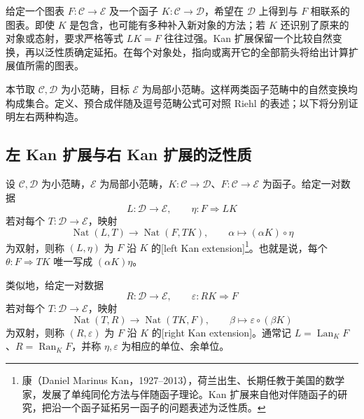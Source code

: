 

给定一个图表 \(F:\mathcal C\rightarrow\mathcal E\) 及一个函子 \(K:\mathcal C\rightarrow\mathcal D\)，希望在 \(\mathcal D\) 上得到与 \(F\) 相联系的图表。即使 \(K\) 是包含，也可能有多种补入新对象的方法；若 \(K\) 还识别了原来的对象或态射，要求严格等式 \(LK=F\) 往往过强。Kan 扩展保留一个比较自然变换，再以泛性质确定延拓。在每个对象处，指向或离开它的全部箭头将给出计算扩展值所需的图表。

\ProseParagraphBreak
本节取 \(\mathcal C,\mathcal D\) 为小范畴，目标 \(\mathcal E\) 为局部小范畴。这样两类函子范畴中的自然变换均构成集合。定义、预合成伴随及逗号范畴公式可对照 Riehl 的表述\cite[Definition 6.1.1; Proposition 6.1.5; Theorem 6.2.1]{Riehl2016CategoryTheory}；以下将分别证明左右两种构造。

\subsection{左 Kan 扩展与右 Kan 扩展的泛性质}
\label{b4:subsec:0305:01}

\begin{definition}[左右 Kan 扩展]\label{b4:def:kan-extension}
	设 \(\mathcal C,\mathcal D\) 为小范畴，\(\mathcal E\) 为局部小范畴，\(K:\mathcal C\rightarrow\mathcal D\)、\(F:\mathcal C\rightarrow\mathcal E\) 为函子。给定一对数据
	\[
		L:\mathcal D\longrightarrow\mathcal E,\qquad \eta:F\Rightarrow LK
	\]
	若对每个 \(T:\mathcal D\rightarrow\mathcal E\)，映射
	\begin{equation}\label{b4:eq:left-kan-universal-property}
		\operatorname{Nat}(L,T)\longrightarrow\operatorname{Nat}(F,TK),
		\qquad \alpha\longmapsto(\alpha K)\circ\eta
	\end{equation}
	为双射，则称 \((L,\eta)\) 为 \(F\) 沿 \(K\) 的[left Kan extension]\footnote{康（Daniel Marinus Kan，1927--2013），荷兰出生、长期任教于美国的数学家，发展了单纯同伦方法与伴随函子理论。Kan 扩展来自他对伴随函子的研究，把沿一个函子延拓另一函子的问题表述为泛性质。}。也就是说，每个 \(\theta:F\Rightarrow TK\) 唯一写成 \((\alpha K)\eta\)。

	\ProseParagraphBreak
	类似地，给定一对数据
	\[
		R:\mathcal D\longrightarrow\mathcal E,\qquad \varepsilon:RK\Rightarrow F
	\]
	若对每个 \(T:\mathcal D\rightarrow\mathcal E\)，映射
	\begin{equation}\label{b4:eq:right-kan-universal-property}
		\operatorname{Nat}(T,R)\longrightarrow\operatorname{Nat}(TK,F),
		\qquad \beta\longmapsto\varepsilon\circ(\beta K)
	\end{equation}
	为双射，则称 \((R,\varepsilon)\) 为 \(F\) 沿 \(K\) 的[right Kan extension]。通常记 \(L=\operatorname{Lan}_K F\)、\(R=\operatorname{Ran}_K F\)，并称 \(\eta,\varepsilon\) 为相应的单位、余单位。
\end{definition}

